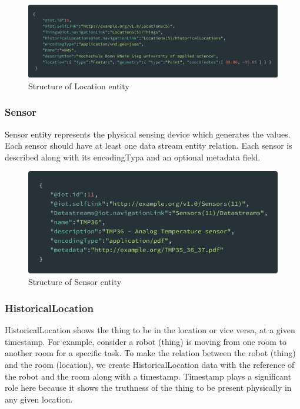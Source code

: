 	\begin{figure}[!htbp] 
		\begin{center}
			\includegraphics[scale=0.1]{./images/png/ogc/location}	
			\caption{Structure of Location entity}	
			\label{fig:location}	
		\end{center}
	\end{figure}

	\subsubsection{Sensor}
	Sensor entity represents the physical sensing device which generates the values. Each sensor should have at least one data stream entity relation. Each sensor is described along with its encodingTypa and an optional metadata field.
	
	\begin{figure}[!htbp] 
		\begin{center}
			\includegraphics[scale=0.1]{./images/png/ogc/sensor}	
			\caption{Structure of Sensor entity}	
			\label{fig:sensor}	
		\end{center}
	\end{figure}

	\subsubsection{HistoricalLocation}
	HistoricalLocation shows the thing to be in the location or vice versa, at a given timestamp. For example, consider a robot (thing) is moving from one room to another room for a specific task. To make the relation between the robot (thing) and the room (location), we create HistoricalLocation data with the reference of the robot and the room along with a timestamp. Timestamp plays a significant role here because it shows the truthness of the thing to be present physically in any given location.
	
